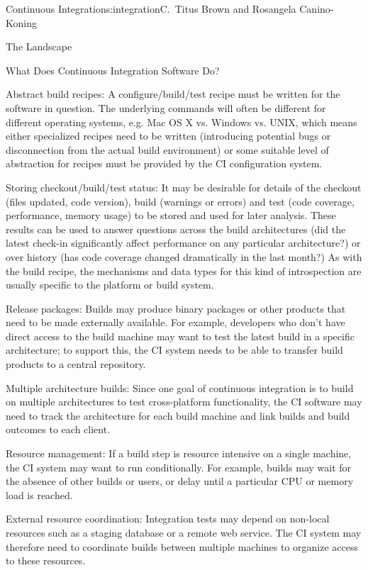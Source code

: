\begin{aosachapter}{Continuous Integration}{s:integration}{C.\ Titus Brown and Rosangela Canino-Koning}
\begin{aosasect1}{The Landscape}
\begin{aosasect2}{What Does Continuous Integration Software Do?}
\begin{aosadescription}
  \item{Abstract build recipes:} A configure/build/test recipe
  must be written for the software in question. The underlying
  commands will often be different for different operating systems,
  e.g. Mac OS X vs. Windows vs. UNIX, which means either specialized
  recipes need to be written (introducing potential bugs or
  disconnection from the actual build environment) or some suitable
  level of abstraction for recipes must be provided by the CI
  configuration system.

  \item{Storing checkout/build/test status:} It may be desirable
  for details of the checkout (files updated, code version), build
  (warnings or errors) and test (code coverage, performance, memory
  usage) to be stored and used for later analysis. These results can
  be used to answer questions across the build architectures (did
  the latest check-in significantly affect performance on any
  particular architecture?) or over history (has code coverage
  changed dramatically in the last month?) As with the build recipe,
  the mechanisms and data types for this kind of introspection are
  usually specific to the platform or build system.

  \item{Release packages:} Builds may produce binary packages or
  other products that need to be made externally available. For
  example, developers who don't have direct access to the build
  machine may want to test the latest build in a specific
  architecture; to support this, the CI system needs to be able to
  transfer build products to a central repository.
  
  \item{Multiple architecture builds:} Since one goal
  of continuous integration is to build on multiple architectures to
  test cross-platform functionality, the CI software may need to
  track the architecture for each build machine and link
  builds and build outcomes to each client.

  \item{Resource management:} If a build step is resource
  intensive on a single machine, the CI system may want to run
  conditionally. For example, builds may wait for the absence of
  other builds or users, or delay until a particular CPU or memory
  load is reached.

  \item{External resource coordination:} Integration tests may
  depend on non-local resources such as a staging database or a
  remote web service. The CI system may therefore need to coordinate
  builds between multiple machines to organize access to these
  resources.


\end{aosadescription}
\end{aosasect2}
\end{aosasect1}
\end{aosachapter}
